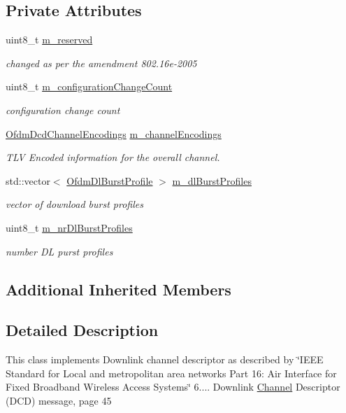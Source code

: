 \subsection*{Private Attributes}
\begin{DoxyCompactItemize}
\item 
uint8\+\_\+t \hyperlink{classns3_1_1Dcd_a279c0ff281741589ea0fd453b1c872b3}{m\+\_\+reserved}
\begin{DoxyCompactList}\small\item\em changed as per the amendment 802.\+16e-\/2005 \end{DoxyCompactList}\item 
uint8\+\_\+t \hyperlink{classns3_1_1Dcd_a36fd01a4f55946d068fc1ae02a0b236f}{m\+\_\+configuration\+Change\+Count}
\begin{DoxyCompactList}\small\item\em configuration change count \end{DoxyCompactList}\item 
\hyperlink{classns3_1_1OfdmDcdChannelEncodings}{Ofdm\+Dcd\+Channel\+Encodings} \hyperlink{classns3_1_1Dcd_a080d5e3e3d2b5f64d74e2bf80f26f7ac}{m\+\_\+channel\+Encodings}
\begin{DoxyCompactList}\small\item\em T\+LV Encoded information for the overall channel. \end{DoxyCompactList}\item 
std\+::vector$<$ \hyperlink{classns3_1_1OfdmDlBurstProfile}{Ofdm\+Dl\+Burst\+Profile} $>$ \hyperlink{classns3_1_1Dcd_af67f6168018932059fd2cd5f6605db8d}{m\+\_\+dl\+Burst\+Profiles}
\begin{DoxyCompactList}\small\item\em vector of download burst profiles \end{DoxyCompactList}\item 
uint8\+\_\+t \hyperlink{classns3_1_1Dcd_a142e47440278d6e122d2796ede295f8a}{m\+\_\+nr\+Dl\+Burst\+Profiles}
\begin{DoxyCompactList}\small\item\em number DL purst profiles \end{DoxyCompactList}\end{DoxyCompactItemize}
\subsection*{Additional Inherited Members}


\subsection{Detailed Description}
This class implements Downlink channel descriptor as described by \char`\"{}\+I\+E\+E\+E Standard for
\+Local and metropolitan area networks Part 16\+: Air Interface for Fixed Broadband Wireless Access Systems\char`\"{} 6.... Downlink \hyperlink{classns3_1_1Channel}{Channel} Descriptor (D\+CD) message, page 45 

